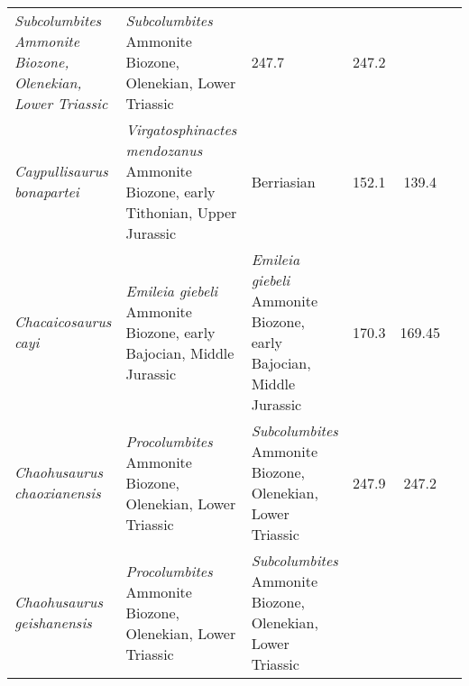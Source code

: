 \begin{longtabu}{>{\itshape}lXXSSl}
        \emph{Subcolumbites} Ammonite Biozone, Olenekian, Lower Triassic
                                                             &
        \emph{Subcolumbites} Ammonite Biozone, Olenekian, Lower Triassic
                                                             & 247.7
                                                             & 247.2
                                                             &
                                                             \cite{Motani2015N} \\                    
	Caypullisaurus bonapartei                            &
        \emph{Virgatosphinactes mendozanus} Ammonite Biozone, early Tithonian,
        Upper Jurassic                                              & Berriasian
                                                                    & 152.1
                                                                    & 139.4
                                                                    &
                                                                    \cite{Fernandez1997JP} \\                 
	Chacaicosaurus cayi                                  & \emph{Emileia
        giebeli} Ammonite Biozone, early Bajocian, Middle Jurassic
                                                             & \emph{Emileia
        giebeli} Ammonite Biozone, early Bajocian, Middle Jurassic
                                                             & 170.3
                                                             & 169.45
                                                             &
                                                             \cite{Fernandez1994A} \\                  
	Chaohusaurus chaoxianensis                           &
        \emph{Procolumbites} Ammonite Biozone, Olenekian, Lower Triassic
                                                             &
        \emph{Subcolumbites} Ammonite Biozone, Olenekian, Lower Triassic
                                                             & 247.9
                                                             & 247.2
                                                             &
                                                             \cite{Motani2014PO,Motani2015JVP} \\          
	Chaohusaurus geishanensis                            &
        \emph{Procolumbites} Ammonite Biozone, Olenekian, Lower Triassic
                                                             &
        \emph{Subcolumbites} Ammonite Biozone, Olenekian, Lower Triassic

\end{longtabu}
